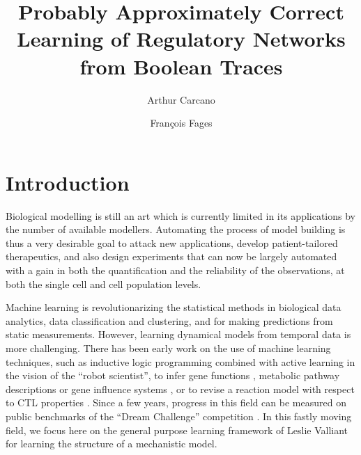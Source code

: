 \documentclass{llncs}
\begin{document}



\title{Probably Approximately Correct Learning of Regulatory Networks from Boolean Traces}

\author{Arthur Carcano \and Fran\c{c}ois Fages}

\maketitle



\begin{abstract}

\end{abstract}

\section{Introduction}


Biological modelling is still an art which is currently limited in its applications by the number of available modellers.
Automating the process of model building is thus a very desirable goal
to attack new applications, develop patient-tailored therapeutics,
and also design experiments that can now be largely automated
with a gain in both the quantification and the reliability of the observations, at both the single cell and cell population levels.

Machine learning is revolutionarizing the statistical methods in biological data analytics,
data classification and clustering, and for making predictions from static measurements.
However, learning dynamical models from temporal data is more challenging.
There has been early work on the use of machine learning techniques, such as inductive
 logic programming \cite{Muggleton95ngc} combined with active learning in the vision of the ``robot scientist'',
to infer gene functions \cite{BMOKRK01etai},
metabolic pathway descriptions \cite{AM02etai,AM02slps}
or gene influence systems \cite{BCRG04jtb},
or to revise a reaction model with respect to CTL properties \cite{CCFS06tcsb}.
Since a few years, progress in this field can be measured on public benchmarks
of the ``Dream Challenge'' competition \cite{Meyer14bmc}.
In this fastly moving field, we focus here on the general purpose learning framework of Leslie Valliant for learning the structure of a mechanistic model.
\end{document}
